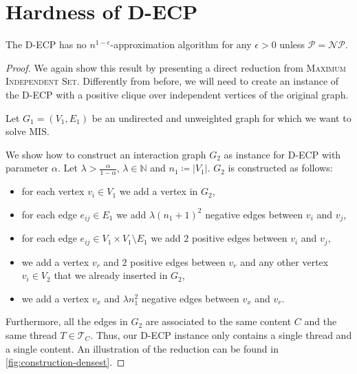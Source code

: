 \section{Hardness of \acrshort{D-ECP}}%
\label{sub:d-ecp-hardness}

\begin{theorem}
	\label{th:approximability-densest}
	The \acrfull{D-ECP} has no $n^{1-\epsilon} $-approximation algorithm for
	any $\epsilon > 0$ unless $\mathcal{P} = \mathcal{NP}  $.
\end{theorem}

\begin{proof}
	We again show this result by presenting a direct reduction from \textsc{Maximum
		Independent Set}. Differently from before, we will need to create an
	instance of the \acrshort{D-ECP} with a positive clique over
	independent vertices of the original graph.

	\bigskip
	Let $G_{1}  = (V_{1} ,E_{1} )$ be an undirected and unweighted graph for
	which we want to solve MIS.

	We show how to construct an interaction graph \mbox{${G}_{2}$} as instance
	for \acrshort{D-ECP} with parameter $\alpha $. Let $\lambda > \frac{\alpha
		}{1 - \alpha }$, $\lambda \in \mathbb{N} $ and $n_{1} \coloneqq |V_{1}| $.
	$G_2$ is constructed as follows:

	\begin{itemize}
		\item for each vertex $v_{i}  \in V_{1} $ we add a vertex in $G_{2} $,
		\item for each edge $e_{ij}  \in
			      E_{1} $ we add $\lambda (n_{1}+1)^{2}  $ negative edges
		      between $v_{i} $ and $v_{j} $,
		\item for each edge $e_{ij} \in V_1 \times V_1 \setminus
			      E_{1} $ we add $2$ positive edges between $v_{i} $ and $v_{j}
		      $,
		\item we add a vertex $v_r$ and $2$ positive edges between $v_r$ and any other
		      vertex $v_i \in V_2$ that we already inserted in $G_2$,
		\item we add a vertex $v_x$ and $\lambda n_{1}^{2}  $ negative edges between $v_x$
		      and $v_{r} $.
	\end{itemize}

	Furthermore, all the edges in $G_{2} $ are associated to the same content
	$C$ and the same thread $T \in \mathcal{T}_{C}  $. Thus, our \acrshort{D-ECP} instance only contains a single thread and a
	single content.
	An illustration of the reduction can be found in
	\autoref{fig:construction-densest}.


\end{proof}
